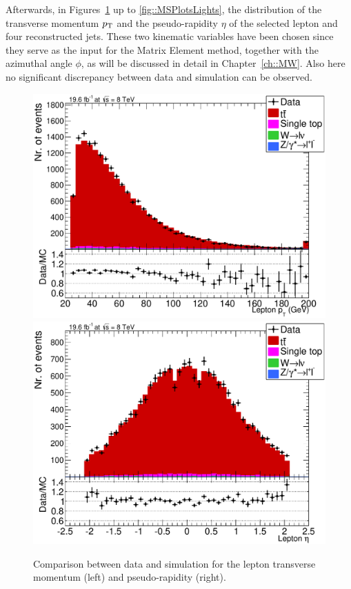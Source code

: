 Afterwards, in Figures~\ref{fig::MSPlotsLept} up to \ref{fig::MSPlotsLights}, the distribution of the transverse momentum $p_{\rm T}$ and the pseudo-rapidity $\eta$ of the selected lepton and four reconstructed jets. These two kinematic variables have been chosen since they serve as the input for the Matrix Element method, together with the azimuthal angle $\phi$, as will be discussed in detail in Chapter~\ref{ch::MW}. Also here no significant discrepancy between data and simulation can be observed.
\begin{figure}[h!tp]
 \centering
 \includegraphics[width = 0.47 \textwidth]{Chapters/Chapter4_EvtSel/Figures/LeptonPt_AllCuts_mu_Stack.pdf} \hspace{0.2cm}
 \includegraphics[width = 0.47 \textwidth]{Chapters/Chapter4_EvtSel/Figures/LeptonEta_AllCuts_mu_Stack.pdf}
 \caption{Comparison between data and simulation for the lepton transverse momentum (left) and pseudo-rapidity (right).} \label{fig::MSPlotsLept}
\end{figure}

